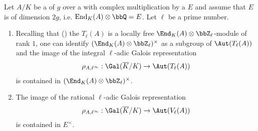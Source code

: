 \begin{definition} \label{corollary:image_of_galois_representation_for_a_cm_abelian_variety_whose_cm_field_is_maximal_degree_is_contained_in_multiplicative_group_of_rational_endomorphism_algebra}
    Let $A/K$ be a  of  $g$ over a  with complex multiplication by a  $E$ and assume that $E$ is of dimension $2g$, i.e. $\operatorname{End}_K(A) \otimes \bbQ = E$. Let $\ell$ be a prime number. 

    \begin{enumerate}
        \item Recalling that () the  $T_\ell(A)$ is a locally free $\End_K(A) \otimes \bbZ_\ell$-module of rank $1$, one can identify $(\End_K(A) \otimes \bbZ_\ell)^\times$ as a subgroup of $\Aut(T_\ell(A))$ and the image of the integral $\ell$-adic Galois representation
        $$\rho_{A, \ell^\infty}: \Gal(\overline{K} / K ) \to \Aut(T_\ell(A))$$
        is contained in $(\End_K(A) \otimes \bbZ_\ell)^\times$.

        \item The image of the rational $\ell$-adic Galois representation
        $$\rho_{A, \ell^\infty}: \Gal(\overline{K} / K ) \to \Aut(V_\ell(A))$$
        is contained in $E^\times$.
    \end{enumerate}

\end{definition}